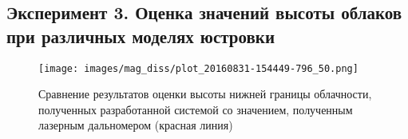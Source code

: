 \newpage
\subsection{Эксперимент 3. Оценка значений высоты облаков при различных моделях юстровки}



\begin{figure}[H]
  \centering
  \texttt{[image: images/mag\_diss/plot\_20160831-154449-796\_50.png]}
  \caption{Сравнение результатов оценки высоты нижней границы облачности,
  полученных разработанной системой со значением, полученным лазерным
  дальномером (красная линия)}
  \label{fig:laser_cloud_height}
\end{figure}





